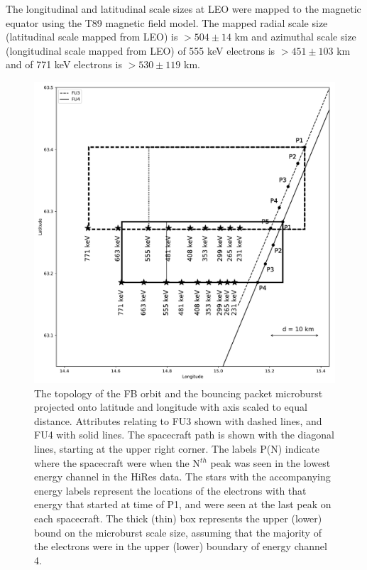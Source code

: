 \documentclass[draft,linenumbers]{agujournal}
\begin{document}
The longitudinal and latitudinal scale sizes at LEO were mapped to the magnetic equator using the T89 magnetic field model. The mapped radial scale size (latitudinal scale mapped from LEO) is $> 504 \pm​ 14$ km and azimuthal scale size (longitudinal scale mapped from LEO) of 555 keV electrons is $> 451 \pm 103$ km and of 771 keV electrons is $> 530 \pm 119$ km.

\begin{figure}
\includegraphics[width=\textwidth]{decay_microburst_distance_corrected_CH4_last_pk_drift.pdf}
\caption{The topology of the FB orbit and the bouncing packet microburst projected onto latitude and longitude with axis scaled to equal distance. Attributes relating to FU3 shown with dashed lines, and FU4 with solid lines. The spacecraft path is shown with the diagonal lines, starting at the upper right corner. The labels P(N) indicate where the spacecraft were when the N$^{th}$ peak was seen in the lowest energy channel in the HiRes data. The stars with the accompanying energy labels represent the locations of the electrons with that energy that started at time of P1, and were seen at the last peak on each spacecraft. The thick (thin) box represents the upper (lower) bound on the microburst scale size, assuming that the majority of the electrons were in the upper (lower) boundary of energy channel 4.}
\label{map_plot}
\end{figure}
\end{document}
